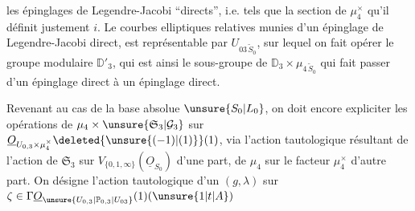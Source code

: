 les  épinglages de Legendre-Jacobi ``directs'', i.e. tels que la section de $\mu_4^\times$ qu'il définit  justement $i$.  Le  courbes elliptiques relatives  munies d'un épinglage de Legendre-Jacobi direct, est représentable par $U_{03\,\widetilde S_0}$, sur lequel on fait opérer le groupe modulaire $\mathbb D'_3$, qui est ainsi  le sous-groupe de $\mathbb D_3\times\mu_{4\,\widetilde S_0}$ qui fait passer d'un épinglage direct à un épinglage direct.

Revenant au cas de la base absolue $\unsure{S_0|L_0}$, on doit encore expliciter les opérations de $\mu_4\times\unsure{\mathfrak S_3|\mathcal G_3}$ sur $\underline O_{U_{0,3}\times\mu_4^\times}\deleted{\unsure{(-1)|(1)}}(1)$, via l'action tautologique résultant de l'action de $\mathfrak S_3$ sur $V_{\{0,1,\infty\}}(\underline O_{S_0})$ d'une part, de  $\mu_4$ sur le facteur $\mu_4^\times$ d'autre part. On désigne l'action tautologique d'un $(g,\lambda)$ sur $\zeta\in\Gamma\underline O_{\unsure{U_{0,3}|\mathbb P_{0,3}|U_{03}}}(1)(\unsure{1|t|A})$
